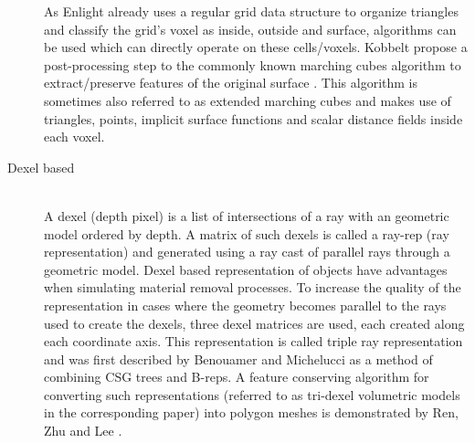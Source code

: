 \begin{description}
As Enlight already uses a regular grid data structure to organize triangles and classify the grid's voxel as inside, outside and surface, algorithms can be used which can directly operate on these cells/voxels.
Kobbelt \etal propose a post-processing step to the commonly known marching cubes algorithm to extract/preserve features of the original surface \cite{extended_marching_cubes}. This algorithm is sometimes also referred to as extended marching cubes and makes use of triangles, points, implicit surface functions and scalar distance fields inside each voxel.


\item[Dexel based] \hfill \\

A dexel (depth pixel) is a list of intersections of a ray with an geometric model ordered by depth. A matrix of such dexels is called a ray-rep (ray representation) and generated using a ray cast of parallel rays through a geometric model. Dexel based representation of objects have advantages when simulating material removal processes. To increase the quality of the representation in cases where the geometry becomes parallel to the rays used to create the dexels, three dexel matrices are used, each created along each coordinate axis. This representation is called triple ray representation and was first described by Benouamer and Michelucci \cite{tridexel_intersection} as a method of combining CSG trees and B-reps. A feature conserving algorithm for converting such representations (referred to as tri-dexel volumetric models in the corresponding paper) into polygon meshes is demonstrated by Ren, Zhu and Lee \cite{tridexel_reconstruction}.

\end{description}
